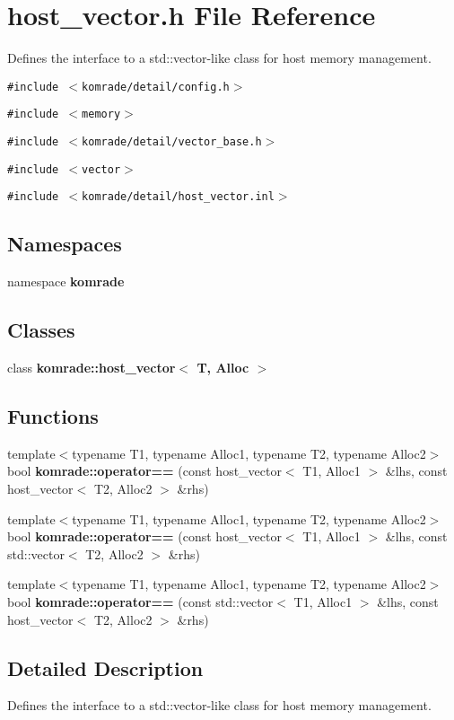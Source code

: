 \section{host\_\-vector.h File Reference}
\label{host__vector_8h}
Defines the interface to a std::vector-like class for host memory management. 

{\tt \#include $<$komrade/detail/config.h$>$}\par
{\tt \#include $<$memory$>$}\par
{\tt \#include $<$komrade/detail/vector\_\-base.h$>$}\par
{\tt \#include $<$vector$>$}\par
{\tt \#include $<$komrade/detail/host\_\-vector.inl$>$}\par
\subsection*{Namespaces}
\begin{CompactItemize}
\item 
namespace {\bf komrade}
\end{CompactItemize}
\subsection*{Classes}
\begin{CompactItemize}
\item 
class {\bf komrade::host\_\-vector$<$ T, Alloc $>$}
\end{CompactItemize}
\subsection*{Functions}
\begin{CompactItemize}
\item 
{\footnotesize template$<$typename T1, typename Alloc1, typename T2, typename Alloc2$>$ }\\bool {\bf komrade::operator==} (const host\_\-vector$<$ T1, Alloc1 $>$ \&lhs, const host\_\-vector$<$ T2, Alloc2 $>$ \&rhs)
\item 
{\footnotesize template$<$typename T1, typename Alloc1, typename T2, typename Alloc2$>$ }\\bool {\bf komrade::operator==} (const host\_\-vector$<$ T1, Alloc1 $>$ \&lhs, const std::vector$<$ T2, Alloc2 $>$ \&rhs)
\item 
{\footnotesize template$<$typename T1, typename Alloc1, typename T2, typename Alloc2$>$ }\\bool {\bf komrade::operator==} (const std::vector$<$ T1, Alloc1 $>$ \&lhs, const host\_\-vector$<$ T2, Alloc2 $>$ \&rhs)
\end{CompactItemize}


\subsection{Detailed Description}
Defines the interface to a std::vector-like class for host memory management. 

